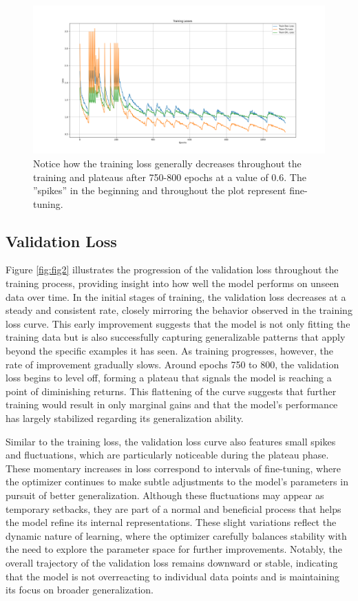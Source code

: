\documentclass[conference]{IEEEtran}
\begin{document}
\begin{figure}[h]
    \centering
    \includegraphics[scale=0.2]{Figure_1.png}
    \caption{
        Notice how the training loss generally decreases throughout the training and plateaus after 750-800 epochs at a value of 0.6. 
        The ''spikes'' in the beginning and throughout the plot represent fine-tuning.
    }
    \label{fig:fig1}
\end{figure}

\subsection{Validation Loss}

Figure \ref{fig:fig2} illustrates the progression of the validation loss throughout the training process, providing insight into how well the model performs on unseen data over time. In the initial stages of training, the validation loss decreases at a steady and consistent rate, closely mirroring the behavior observed in the training loss curve. This early improvement suggests that the model is not only fitting the training data but is also successfully capturing generalizable patterns that apply beyond the specific examples it has seen. As training progresses, however, the rate of improvement gradually slows. Around epochs 750 to 800, the validation loss begins to level off, forming a plateau that signals the model is reaching a point of diminishing returns. This flattening of the curve suggests that further training would result in only marginal gains and that the model’s performance has largely stabilized regarding its generalization ability.

Similar to the training loss, the validation loss curve also features small spikes and fluctuations, which are particularly noticeable during the plateau phase. These momentary increases in loss correspond to intervals of fine-tuning, where the optimizer continues to make subtle adjustments to the model's parameters in pursuit of better generalization. Although these fluctuations may appear as temporary setbacks, they are part of a normal and beneficial process that helps the model refine its internal representations. These slight variations reflect the dynamic nature of learning, where the optimizer carefully balances stability with the need to explore the parameter space for further improvements. Notably, the overall trajectory of the validation loss remains downward or stable, indicating that the model is not overreacting to individual data points and is maintaining its focus on broader generalization.
\end{document}
